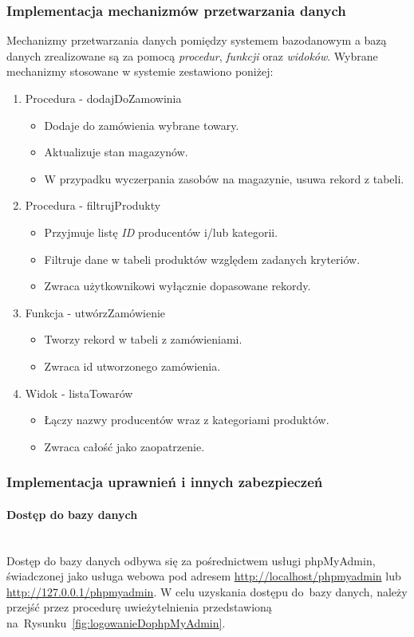 \documentclass[a4paper, 12pt]{article}
\begin{document}
\subsubsection{Implementacja mechanizmów przetwarzania danych}
Mechanizmy przetwarzania danych pomiędzy systemem bazodanowym a bazą danych zrealizowane są za pomocą \textit{procedur}, \textit{funkcji} oraz \textit{widoków}. Wybrane mechanizmy stosowane w systemie zestawiono poniżej:

\begin{enumerate}
\item Procedura - dodajDoZamowinia
\begin{itemize}
\item Dodaje do zamówienia wybrane towary.
\item Aktualizuje stan magazynów.
\item W przypadku wyczerpania zasobów na magazynie, usuwa rekord z tabeli.
\end{itemize}
\item Procedura - filtrujProdukty
\begin{itemize}
\item Przyjmuje listę \textit{ID} producentów i/lub kategorii.
\item Filtruje dane w tabeli produktów względem zadanych kryteriów.
\item Zwraca użytkownikowi wyłącznie dopasowane rekordy.
\end{itemize}
\item Funkcja - utwórzZamówienie
\begin{itemize}
\item Tworzy rekord w tabeli z zamówieniami.
\item Zwraca id utworzonego zamówienia.
\end{itemize}
\item Widok - listaTowarów
\begin{itemize}
\item Łączy nazwy producentów wraz z kategoriami produktów.
\item Zwraca całość jako zaopatrzenie.
\end{itemize}
\end{enumerate}

\subsubsection{Implementacja uprawnień i innych zabezpieczeń}
\paragraph{Dostęp do bazy danych} \mbox{}\\
Dostęp do bazy danych odbywa się za pośrednictwem usługi phpMyAdmin, świadczonej jako usługa webowa pod adresem \url{http://localhost/phpmyadmin} lub \url{http://127.0.0.1/phpmyadmin}. W celu uzyskania dostępu do~bazy danych, należy przejść przez procedurę uwieżytelnienia przedstawioną na~Rysunku~\ref{fig:logowanieDophpMyAdmin}.
\end{document}
